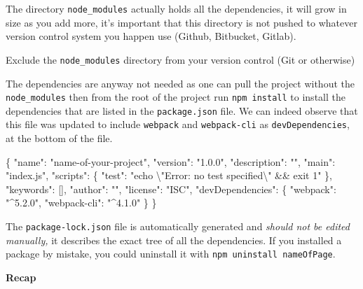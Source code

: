 \documentclass[
]{krantz}
\makeatletter
\newenvironment{Shaded}{\begin{snugshade}}{\end{snugshade}}
\newcommand{\CharTok}[1]{\textcolor[rgb]{0.5,0.5,0.5}{#1}}
\newcommand{\DataTypeTok}[1]{\textcolor[rgb]{0.27,0.27,0.27}{#1}}
\newcommand{\FunctionTok}[1]{\textcolor[rgb]{0,0,0}{#1}}
\newcommand{\OtherTok}[1]{\textcolor[rgb]{0.37,0.37,0.37}{#1}}
\newcommand{\StringTok}[1]{\textcolor[rgb]{0.5,0.5,0.5}{#1}}
\newenvironment{kframe}{%
\medskip{}
\setlength{\fboxsep}{.8em}
 \def\at@end@of@kframe{}%
 \ifinner\ifhmode%
  \def\at@end@of@kframe{\end{minipage}}%
  \begin{minipage}{\columnwidth}%
 \fi\fi%
 \def\FrameCommand##1{\hskip\@totalleftmargin \hskip-\fboxsep
 \colorbox{shadecolor}{##1}\hskip-\fboxsep
     \hskip-\linewidth \hskip-\@totalleftmargin \hskip\columnwidth}%
 \MakeFramed {\advance\hsize-\width
   \@totalleftmargin\z@ \linewidth\hsize
   \@setminipage}}%
 {\par\unskip\endMakeFramed%
 \at@end@of@kframe}
\renewenvironment{Shaded}{\begin{kframe}}{\end{kframe}}
\newenvironment{rmdblock}[1]
  {
  \begin{itemize}
  \renewcommand{\labelitemi}{
    \raisebox{-.7\height}[0pt][0pt]{
      {\setkeys{Gin}{width=3em,keepaspectratio}\texttt{[image: images/\#1]}}
    }
  }
  \setlength{\fboxsep}{1em}
  \begin{kframe}
  \item
  }
  {
  \end{kframe}
  \end{itemize}
  }
\newenvironment{rmdnote}
  {\begin{rmdblock}{note}}
  {\end{rmdblock}}
\makeatother
\begin{document}
The directory \texttt{node\_modules} actually holds all the dependencies, it will grow in size as you add more, it's important that this directory is not pushed to whatever version control system you happen use (Github, Bitbucket, Gitlab).

\begin{rmdnote}
Exclude the \texttt{node\_modules} directory from your version control
(Git or otherwise)
\end{rmdnote}

The dependencies are anyway not needed as one can pull the project without the \texttt{node\_modules} then from the root of the project run \texttt{npm\ install} to install the dependencies that are listed in the \texttt{package.json} file. We can indeed observe that this file was updated to include \texttt{webpack} and \texttt{webpack-cli} as \texttt{devDependencies}, at the bottom of the file.

\begin{Shaded}
\begin{Highlighting}[]
\FunctionTok{\{}
  \DataTypeTok{"name"}\FunctionTok{:} \StringTok{"name{-}of{-}your{-}project"}\FunctionTok{,}
  \DataTypeTok{"version"}\FunctionTok{:} \StringTok{"1.0.0"}\FunctionTok{,}
  \DataTypeTok{"description"}\FunctionTok{:} \StringTok{""}\FunctionTok{,}
  \DataTypeTok{"main"}\FunctionTok{:} \StringTok{"index.js"}\FunctionTok{,}
  \DataTypeTok{"scripts"}\FunctionTok{:} \FunctionTok{\{}
    \DataTypeTok{"test"}\FunctionTok{:} \StringTok{"echo }\CharTok{\textbackslash{}"}\StringTok{Error: no test specified}\CharTok{\textbackslash{}"}\StringTok{ \&\& exit 1"}
  \FunctionTok{\},}
  \DataTypeTok{"keywords"}\FunctionTok{:} \OtherTok{[]}\FunctionTok{,}
  \DataTypeTok{"author"}\FunctionTok{:} \StringTok{""}\FunctionTok{,}
  \DataTypeTok{"license"}\FunctionTok{:} \StringTok{"ISC"}\FunctionTok{,}
  \DataTypeTok{"devDependencies"}\FunctionTok{:} \FunctionTok{\{}
    \DataTypeTok{"webpack"}\FunctionTok{:} \StringTok{"\^{}5.2.0"}\FunctionTok{,}
    \DataTypeTok{"webpack{-}cli"}\FunctionTok{:} \StringTok{"\^{}4.1.0"}
  \FunctionTok{\}}
\FunctionTok{\}}
\end{Highlighting}
\end{Shaded}

The \texttt{package-lock.json} file is automatically generated and \emph{should not be edited manually,} it describes the exact tree of all the dependencies. If you installed a package by mistake, you could uninstall it with \texttt{npm\ uninstall\ nameOfPage}.

\textbf{Recap}
\end{document}
